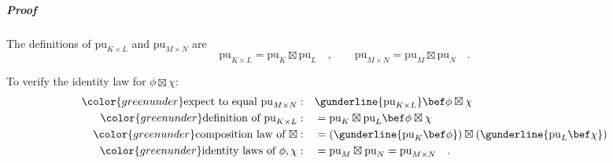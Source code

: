 \subparagraph{Proof}

The definitions of $\text{pu}_{K\times L}$ and $\text{pu}_{M\times N}$
are
\[
\text{pu}_{K\times L}=\text{pu}_{K}\boxtimes\text{pu}_{L}\quad,\quad\quad\text{pu}_{M\times N}=\text{pu}_{M}\boxtimes\text{pu}_{N}\quad.
\]

To verify the identity law for $\phi\boxtimes\chi$:
\begin{align*}
{\color{greenunder}\text{expect to equal }\text{pu}_{M\times N}:}\quad & \gunderline{\text{pu}_{K\times L}}\bef\phi\boxtimes\chi\\
{\color{greenunder}\text{definition of }\text{pu}_{K\times L}:}\quad & =\text{pu}_{K}\boxtimes\text{pu}_{L}\bef\phi\boxtimes\chi\\
{\color{greenunder}\text{composition law of }\boxtimes:}\quad & =(\gunderline{\text{pu}_{K}\bef\phi})\boxtimes(\gunderline{\text{pu}_{L}\bef\chi})\\
{\color{greenunder}\text{identity laws of }\phi,\chi:}\quad & =\text{pu}_{M}\boxtimes\text{pu}_{N}=\text{pu}_{M\times N}\quad.
\end{align*}

